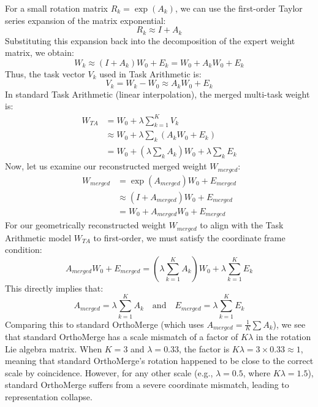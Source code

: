 \documentclass{article}
\theoremstyle{plain}
\theoremstyle{definition}
\theoremstyle{remark}
\begin{document}
For a small rotation matrix $R_k = \exp(A_k)$, we can use the first-order Taylor series expansion of the matrix exponential:
\begin{equation}
    R_k \approx I + A_k
\end{equation}
Substituting this expansion back into the decomposition of the expert weight matrix, we obtain:
\begin{equation}
    W_k \approx (I + A_k) W_0 + E_k = W_0 + A_k W_0 + E_k
\end{equation}
Thus, the task vector $V_k$ used in Task Arithmetic is:
\begin{equation}
    V_k = W_k - W_0 \approx A_k W_0 + E_k
\end{equation}
In standard Task Arithmetic (linear interpolation), the merged multi-task weight is:
\begin{align}
    W_{TA} &= W_0 + \lambda \sum_{k=1}^K V_k \nonumber \\
    &\approx W_0 + \lambda \sum_k (A_k W_0 + E_k) \nonumber \\
    &= W_0 + \left( \lambda \sum_k A_k \right) W_0 + \lambda \sum_k E_k
\end{align}
Now, let us examine our reconstructed merged weight $W_{merged}$:
\begin{align}
    W_{merged} &= \exp(A_{merged}) W_0 + E_{merged} \nonumber \\
    &\approx (I + A_{merged}) W_0 + E_{merged} \nonumber \\
    &= W_0 + A_{merged} W_0 + E_{merged}
\end{align}
For our geometrically reconstructed weight $W_{merged}$ to align with the Task Arithmetic model $W_{TA}$ to first-order, we must satisfy the coordinate frame condition:
\begin{equation}
    A_{merged} W_0 + E_{merged} = \left( \lambda \sum_{k=1}^K A_k \right) W_0 + \lambda \sum_{k=1}^K E_k
\end{equation}
This directly implies that:
\begin{equation}
    A_{merged} = \lambda \sum_{k=1}^K A_k \quad \text{and} \quad E_{merged} = \lambda \sum_{k=1}^K E_k
\end{equation}
Comparing this to standard OrthoMerge (which uses $A_{merged} = \frac{1}{K} \sum A_k$), we see that standard OrthoMerge has a scale mismatch of a factor of $K\lambda$ in the rotation Lie algebra matrix. When $K = 3$ and $\lambda = 0.33$, the factor is $K\lambda = 3 \times 0.33 \approx 1$, meaning that standard OrthoMerge's rotation happened to be close to the correct scale by coincidence. However, for any other scale (e.g., $\lambda = 0.5$, where $K\lambda = 1.5$), standard OrthoMerge suffers from a severe coordinate mismatch, leading to representation collapse. 
\end{document}
